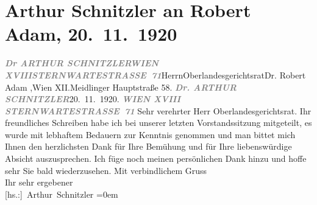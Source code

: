 

         
         \renewcommand{\erwaehntePersonen}{Personen: Robert Adam}
         \renewcommand{\erwaehnteInstitutionen}{Institutionen: Deutschösterreichischer Autorenverband}
         \renewcommand{\erwaehnteOrte}{Orte: IX., Alsergrund, Meidlinger Hauptstraße, Sternwartestraße, Wien, XII., Meidling, XVIII., Währing}
         \renewcommand{\erwaehnteWerke}{}
               \section[Arthur Schnitzler an Robert Adam, 20. 11. 1920]{ Arthur Schnitzler an Robert Adam, 20. 11. 1920}\nopagebreak{}\rehead{ }\begin{ledgroupsized}[t]{13cm}\normalsize\beginnumbering \toendnotes[C]{\smallbreak\pagebreak[2]} 
\toendnotes[C]{\smallbreak}\pstart{}{\pb}\textcolor{gray}{\textbf{\textit{Dr ARTHUR SCHNITZLER}}}\pend{}\pstart{}\textcolor{gray}{\textbf{\textit{WIEN XVIII}}}\pend{}\pstart{}\textcolor{gray}{\textbf{\textit{STERNWARTESTRASSE 71}}}\pend{}{\bigskip}\pstart{}{\pb}Herrn\pend{}\pstart{}Oberlandesgerichtsrat\pend{}\pstart{}Dr. Robert Adam ,\pend{}\pstart{}Wien XII.\pend{}\pstart{}Meidlinger Hauptstraße 58.\pend{}{\bigskip}\pstart
           \noindent{}{\pb}\textcolor{gray}{\textbf{\textit{Dr. ARTHUR SCHNITZLER}}}\hfill 20. 11. 1920.\pend
           \pstart
           \textcolor{gray}{\textbf{\textit{WIEN XVIII}}}\pend
           \pstart
           \textcolor{gray}{\textbf{\textit{STERNWARTESTRASSE 71}}}\pend
           \pstart{}Sehr verehrter Herr Oberlandesgerichtsrat.\pend\pstart
           Ihr freundliches Schreiben habe ich bei unserer letzten Vorstandssitzung mitgeteilt, es wurde mit
               lebhaftem Bedauern zur Kenntnis genommen und man bittet mich Ihnen den herzlichsten
               Dank für Ihre Bemühung und für Ihre liebenswürdige Absicht auszusprechen.\pend
           \pstart
           Ich füge noch meinen persönlichen Dank hinzu und hoffe sehr Sie bald
               wiederzusehen.\pend
           \pstart
           Mit verbindlichem Gruss{\\[\baselineskip]}Ihr sehr ergebener{\\[\baselineskip]}\spacefill\mbox{{[}hs.:{]} Arthur Schnitzler}\pend
           \leftskip=0em{}
         

\end{ledgroupsized}
